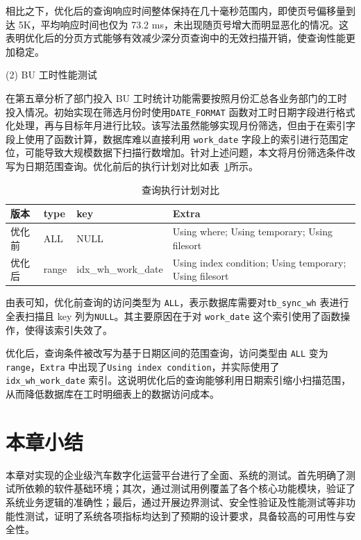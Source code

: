 相比之下，优化后的查询响应时间整体保持在几十毫秒范围内，即使页号偏移量到达 5K，平均响应时间也仅为 73.2 ms，未出现随页号增大而明显恶化的情况。这表明优化后的分页方式能够有效减少深分页查询中的无效扫描开销，使查询性能更加稳定。

(2) BU 工时性能测试

在第五章分析了部门投入 BU 工时统计功能需要按照月份汇总各业务部门的工时投入情况。初始实现在筛选月份时使用\texttt{DATE\_FORMAT} 函数对工时日期字段进行格式化处理，再与目标年月进行比较。该写法虽然能够实现月份筛选，但由于在索引字段上使用了函数计算，数据库难以直接利用
\texttt{work\_date} 字段上的索引进行范围定位，可能导致大规模数据下扫描行数增加。针对上述问题，本文将月份筛选条件改写为日期范围查询。优化前后的执行计划对比如表~\ref{tab:sql-exec-plan}所示。
\begin{table}[htbp]
	\centering
	\caption{查询执行计划对比}
	\label{tab:sql-exec-plan}
	{\songti\seuwuhao\selectfont
		\begin{tabular}{llll}
			\toprule
			版本 & type & key & Extra \\
			\midrule
			优化前 & ALL & NULL & Using where; Using temporary; Using filesort \\
			优化后 & range & idx\_wh\_work\_date & Using index condition; Using temporary; Using filesort \\
			\bottomrule
		\end{tabular}
	}
\end{table}

由表可知，优化前查询的访问类型为 \texttt{ALL}，表示数据库需要对\texttt{tb\_sync\_wh} 表进行全表扫描且 key 列为\texttt{NULL}。其主要原因在于对 \texttt{work\_date} 这个索引使用了函数操作，使得该索引失效了。

优化后，查询条件被改写为基于日期区间的范围查询，访问类型由 \texttt{ALL} 变为\texttt{range}，\texttt{Extra} 中出现了\texttt{Using index condition}，并实际使用了 \texttt{idx\_wh\_work\_date} 索引。这说明优化后的查询能够利用日期索引缩小扫描范围，从而降低数据库在工时明细表上的数据访问成本。

\section{本章小结}
本章对实现的企业级汽车数字化运营平台进行了全面、系统的测试。首先明确了测试所依赖的软件基础环境；其次，通过测试用例覆盖了各个核心功能模块，验证了系统业务逻辑的准确性；最后，通过开展边界测试、安全性验证及性能测试等非功能性测试，证明了系统各项指标均达到了预期的设计要求，具备较高的可用性与安全性。